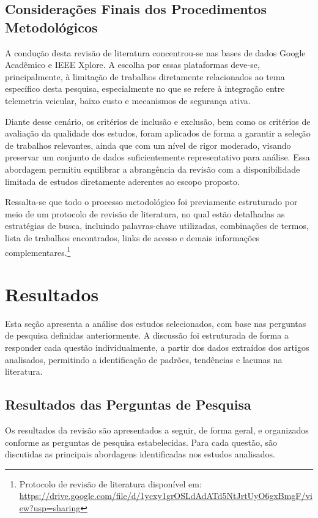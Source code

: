 \documentclass[
	article,			%
	11pt,				%
	oneside,			%
	a4paper,			%
	english,			%
	brazil,				%
	sumario=tradicional
	]{abntex2}
\begin{document}
\subsection{Considerações Finais dos Procedimentos Metodológicos}

A condução desta revisão de literatura concentrou-se nas bases de dados Google Acadêmico e IEEE Xplore. A escolha por essas plataformas deve-se, principalmente, à limitação de trabalhos diretamente relacionados ao tema específico desta pesquisa, especialmente no que se refere à integração entre telemetria veicular, baixo custo e mecanismos de segurança ativa.

Diante desse cenário, os critérios de inclusão e exclusão, bem como os critérios de avaliação da qualidade dos estudos, foram aplicados de forma a garantir a seleção de trabalhos relevantes, ainda que com um nível de rigor moderado, visando preservar um conjunto de dados suficientemente representativo para análise. Essa abordagem permitiu equilibrar a abrangência da revisão com a disponibilidade limitada de estudos diretamente aderentes ao escopo proposto.

Ressalta-se que todo o processo metodológico foi previamente estruturado por meio de um protocolo de revisão de literatura, no qual estão detalhadas as estratégias de busca, incluindo palavras-chave utilizadas, combinações de termos, lista de trabalhos encontrados, links de acesso e demais informações complementares.\footnote{Protocolo de revisão de literatura disponível em: \url{https://drive.google.com/file/d/1ycxy1grOSLdAdATd5NtJrtUyO6gxBmgF/view?usp=sharing}}

\section{Resultados}

Esta seção apresenta a análise dos estudos selecionados, com base nas perguntas de pesquisa definidas anteriormente. A discussão foi estruturada de forma a responder cada questão individualmente, a partir dos dados extraídos dos artigos analisados, permitindo a identificação de padrões, tendências e lacunas na literatura.

\subsection{Resultados das Perguntas de Pesquisa}
Os resultados da revisão são apresentados a seguir, de forma geral, e organizados conforme as perguntas de pesquisa estabelecidas. Para cada questão, são discutidas as principais abordagens identificadas nos estudos analisados.
\end{document}
